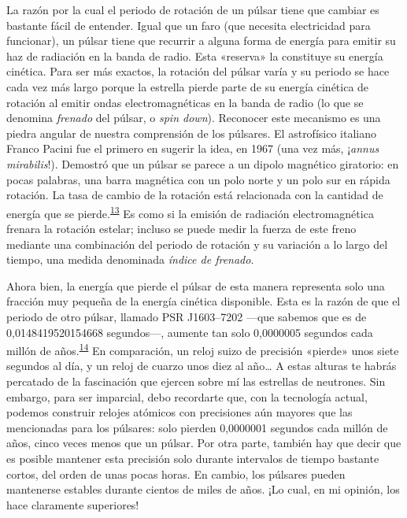 La razón por la cual el periodo de rotación de un púlsar tiene que cambiar es bastante fácil de entender. Igual que un faro (que necesita electricidad para funcionar), un púlsar tiene que recurrir a alguna forma de energía para emitir su haz de radiación en la banda de radio. Esta «reserva» la constituye su energía cinética. Para ser más exactos, la rotación del púlsar varía y su periodo se hace cada vez más largo porque la estrella pierde parte de su energía cinética de rotación al emitir ondas electromagnéticas en la banda de radio (lo que se denomina \emph{frenado} del púlsar, o \emph{spin down}). Reconocer este mecanismo es una piedra angular de nuestra comprensión de los púlsares. El astrofísico italiano Franco Pacini fue el primero en sugerir la idea, en 1967 (una vez más, ¡\emph{annus mirabilis}!). Demostró que un púlsar se parece a un dipolo magnético giratorio: en pocas palabras, una barra magnética con un polo norte y un polo sur en rápida rotación. La tasa de cambio de la rotación está relacionada con la cantidad de energía que se pierde.\textsuperscript{\hyperlink{note:05-13}{13}} Es como si la emisión de radiación electromagnética frenara la rotación estelar; incluso se puede medir la fuerza de este freno mediante una combinación del periodo de rotación y su variación a lo largo del tiempo, una medida denominada \emph{índice de frenado}.

Ahora bien, la energía que pierde el púlsar de esta manera representa solo una fracción muy pequeña de la energía cinética disponible. Esta es la razón de que el periodo de otro púlsar, llamado PSR J1603--7202 ---que sabemos que es de 0,0148419520154668 segundos---, aumente tan solo 0,0000005 segundos cada millón de años.\textsuperscript{\hyperlink{note:05-14}{14}} En comparación, un reloj suizo de precisión «pierde» unos siete segundos al día, y un reloj de cuarzo unos diez al año… A estas alturas te habrás percatado de la fascinación que ejercen sobre mí las estrellas de neutrones. Sin embargo, para ser imparcial, debo recordarte que, con la tecnología actual, podemos construir relojes atómicos con precisiones aún mayores que las mencionadas para los púlsares: solo pierden 0,0000001 segundos cada millón de años, cinco veces menos que un púlsar. Por otra parte, también hay que decir que es posible mantener esta precisión solo durante intervalos de tiempo bastante cortos, del orden de unas pocas horas. En cambio, los púlsares pueden mantenerse estables durante cientos de miles de años. ¡Lo cual, en mi opinión, los hace claramente superiores!

